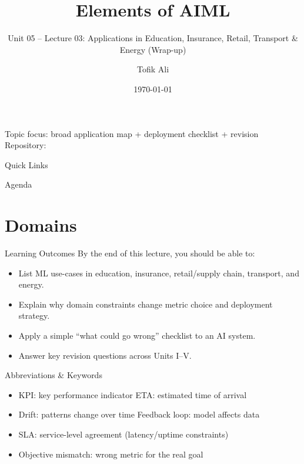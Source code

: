 \documentclass[aspectratio=169]{beamer}
\title[Elements of AIML]{Elements of AIML}
\subtitle{Unit 05 -- Lecture 03: Applications in Education, Insurance, Retail, Transport \& Energy (Wrap-up)}
\author{Tofik Ali}
\institute{School of Computer Science, UPES Dehradun}
\date{\today}
\begin{document}
\UPESCoverFrame
\setcounter{framenumber}{0}

\begin{frame}
  \titlepage
  \vspace{0.3em}
  \begin{center}
    \footnotesize Topic focus: broad application map + deployment checklist + revision\\[0.25em]
    \footnotesize Repository: \texttt{\AIMLRepoURL}
  \end{center}
  \slidesources{\AIMLUnitVSources}
\end{frame}

\begin{frame}{Quick Links}
  \centering
  \hyperlink{sec:domains}{}\hspace{0.6em}
  \hyperlink{sec:check}{}\hspace{0.6em}
  \hyperlink{sec:wrap}{}\hspace{0.6em}
  \hyperlink{sec:rev}{}\hspace{0.6em}
  \hyperlink{sec:summary}{}
\end{frame}

\begin{frame}{Agenda}
  \tableofcontents
\end{frame}

\section{Domains}
\label{sec:domains}

\begin{frame}{Learning Outcomes}
  By the end of this lecture, you should be able to:
  \begin{itemize}[<+->]
    \item List ML use-cases in education, insurance, retail/supply chain, transport, and energy.
    \item Explain why domain constraints change metric choice and deployment strategy.
    \item Apply a simple ``what could go wrong'' checklist to an AI system.
    \item Answer key revision questions across Units I--V.
  \end{itemize}
\end{frame}

\begin{frame}{Abbreviations \& Keywords}
  \begin{itemize}[<+->]
    \item KPI: key performance indicator \hfill ETA: estimated time of arrival
    \item Drift: patterns change over time \hfill Feedback loop: model affects data
    \item SLA: service-level agreement (latency/uptime constraints)
    \item Objective mismatch: wrong metric for the real goal
  \end{itemize}
\end{frame}
\end{document}
